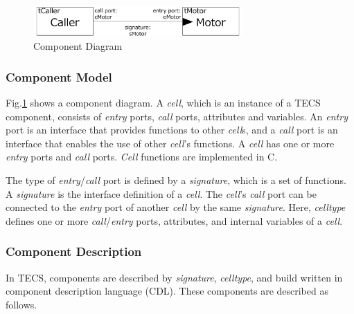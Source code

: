 \documentclass[JIP]{ipsj_v2/UTF8/ipsj}
\begin{document}
\begin{figure}[t]
    \centering
    \includegraphics[width=8cm,clip]{figure/component_diagram.pdf}
    \caption{Component Diagram}
    \label{fig:component}
\end{figure}

\subsubsection{Component Model}
Fig.\ref{fig:component} shows a component diagram.
A {\it cell}, which is an instance of a TECS component, consists of {\it entry} ports, {\it call} ports, attributes and variables.
An {\it entry} port is an interface that provides functions to other {\it cell}s, and a {\it call} port is an interface that enables the use of other {\it cell}'s functions.
A {\it cell} has one or more {\it entry} ports and {\it call} ports.
{\it Cell} functions are implemented in C.

The type of {\it entry}/{\it call} port is defined by a {\it signature}, which is a set of functions.
A {\it signature} is the interface definition of a {\it cell}.
The {\it cell}'s  {\it call} port can be connected to the {\it entry} port of another {\it cell} by the same {\it signature}.
Here, {\it celltype} defines one or more {\it call}/{\it entry} ports, attributes, and internal variables of a {\it cell}.


\subsubsection{Component Description}
In TECS, components are described by {\it signature}, {\it celltype}, and build written in component description language (CDL).
These components are described as follows.
\end{document}
